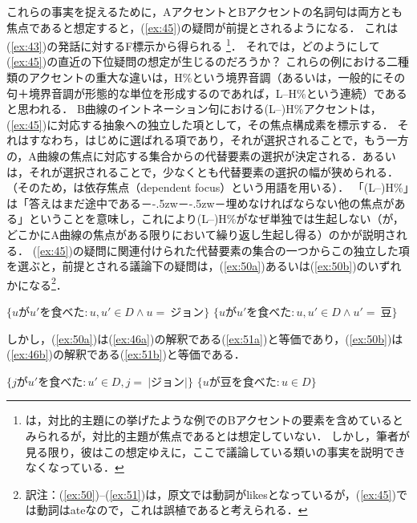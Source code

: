 \documentclass{goken}
\newcommand{\term}[2]{\textsf{#1}（#2）}
\def\ddash{－\kern-.5zw－\kern-.5zw－}
\newcommand{\ori}[1]{\noindent\textcolor[gray]{0.7}{\fontsize{8pt}{8pt}\selectfont{\textsf{(p.~#1)}}} }
\begin{document}
これらの事実を捉えるために，AアクセントとBアクセントの名詞句は両方とも焦点であると想定すると，(\ref{ex:45})の疑問が前提とされるようになる．
これは(\ref{ex:43})の発話に対するF標示から得られる
\footnote{%
  \citeauthor{Vallduvi1990}は，対比的主題に\citeauthor{Jackendoff1972}の挙げたような例でのBアクセントの要素を含めているとみられるが，対比的主題が焦点であるとは想定していない．
  しかし，筆者が見る限り，彼はこの想定ゆえに，ここで議論している類いの事実を説明できなくなっている．
}．
それでは，どのようにして(\ref{ex:45})の直近の下位疑問の想定が生じるのだろうか？
これらの例における二種類のアクセントの重大な違いは，H\%という境界音調（あるいは，一般的にその句＋境界音調が形態的な単位を形成するのであれば，L--H\%という連続）であると思われる．
B曲線のイントネーション句における(L--)H\%アクセントは，(\ref{ex:45})に対応する抽象への独立した項として，その焦点構成素を標示する．
それはすなわち，はじめに選ばれる項であり，それが選択されることで，もう一方の，A曲線の焦点に対応する集合からの代替要素の選択が決定される．あるいは，それが選択されることで，少なくとも代替要素の選択の幅が狭められる．（そのため，\citeauthor{Jackendoff1972}は\term{依存焦点}{dependent focus}という用語を用いる）．
「(L--)H\%」は「答えはまだ途中である\ddash{}埋めなければならない他の焦点がある」ということを意味し，これにより(L--)H\%がなぜ単独では生起しない（が，どこかにA曲線の焦点がある限りにおいて繰り返し生起し得る）のかが説明される．
\renewcommand{\thefootnote}{\fnsymbol{footnote}}
\setcounter{footnote}{0}
(\ref{ex:45})の疑問に関連付けられた代替要素の集合の一つからこの独立した項を選ぶと，前提とされる議論下の疑問は，(\ref{ex:50a})あるいは(\ref{ex:50b})のいずれかになる\footnote{訳注：(\ref{ex:50})--(\ref{ex:51})は，原文では動詞がlikesとなっているが，(\ref{ex:45})では動詞はateなので，これは誤植であると考えられる．}．

\begin{exe}
	\ex\label{ex:50}
  \begin{xlist}
    \ex\label{ex:50a}
    $\{u \text{が} u' \text{を食べた}: u, u' \in D \wedge u =\ \text{ジョン}\}$
    \ex\label{ex:50b}
    $\{u \text{が} u' \text{を食べた}: u, u' \in D \wedge u' =\ \text{豆}\}$
  \end{xlist}
\end{exe}

\noindent
しかし，(\ref{ex:50a})は(\ref{ex:46a})の解釈である(\ref{ex:51a})と等価であり，(\ref{ex:50b})は(\ref{ex:46b})の解釈である(\ref{ex:51b})と等価である．

\ori{50}
\begin{exe}
	\ex\label{ex:51}
  \begin{xlist}
    \ex\label{ex:51a}
    $\{j \text{が} u' \text{を食べた}: u' \in D, j =\ |\text{ジョン}|\}$
    \ex\label{ex:51b}
    $\{u \text{が豆を食べた}: u \in D\}$
  \end{xlist}
\end{exe}
\end{document}
